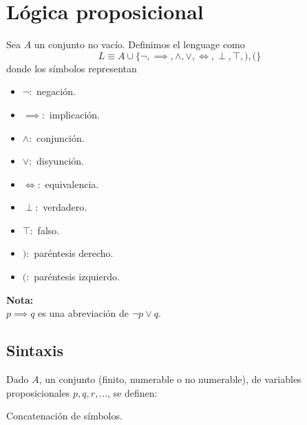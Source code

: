 \section{Lógica proposicional}
Sea $A$ un conjunto no vacío.
Definimos el lenguage como
$$L \equiv A\cup\{\neg,\implies, \wedge, \vee, \iff, \perp, \top, ), ( \}$$
donde los símbolos representan
\begin{itemize}
	\item $\neg:$ negación.
	\item $\implies:$ implicación.
	\item $\wedge:$ conjunción.
	\item $\vee:$ disyunción.
	\item $\iff:$ equivalencia.
	\item $\perp:$ verdadero.
	\item $\top:$ falso.
	\item $):$ paréntesis derecho.
	\item $(:$ paréntesis izquierdo.
\end{itemize}

\begin{mdframed}
\noindent\textbf{Nota:}\\
$p\implies q$ es una abreviación de $\neg p \vee q$.
\end{mdframed}

\subsection{Sintaxis}
Dado $A$, un conjunto (finito, numerable o no numerable), de variables proposicionales $p, q, r, \hdots$, se definen:

\begin{defn}[Palabra]
	Concatenación de símbolos.
\end{defn}

